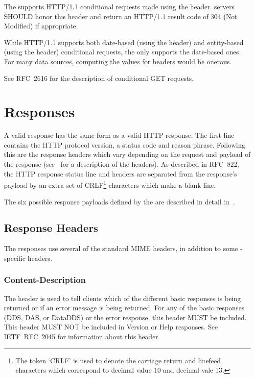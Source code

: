 \documentclass[justify]{nasa-ese}
\begin{document}
The \DAP supports HTTP/1.1 conditional requests made using the
 header. \DAP servers SHOULD honor this header
and return an HTTP/1.1 result code of 304 (Not Modified) if
appropriate. 

While HTTP/1.1 supports both date-based (using the 
header) and entity-based (using the  header) conditional
requests, the \DAP only supports the date-based ones. For many data
sources, computing the values for  headers would be onerous.

See RFC~2616\cite{rfc2616} for the description of
conditional GET requests.

\section{Responses}
\label{sec-responses}

A valid \DAP response has the same form as a valid \ac{HTTP} response. The
first line contains the \ac{HTTP} protocol version, a status code and reason
phrase\cite{rfc2616}. Following this are the response headers which vary
depending on the request and payload of the response
(see~ for a description of the headers). As
described in RFC~822\cite{rfc822}, the \ac{HTTP} response status line and
headers are separated from the response's payload by an extra set of
CRLF\footnote{The token `CRLF' is used to denote the carriage return and
  linefeed characters which correspond to decimal value 10 and decimal vale
  13.} characters which make a blank line.

The six possible response payloads defined by the \DAP are described
in detail in~.

\subsection{Response Headers}
\label{sec-resp-headers}

The \DAP responses use several of the standard MIME headers, in
addition to some \DAP-specific headers.

\subsubsection{Content-Description}
The  header is used to tell clients which of the
different basic responses is being returned or if an error message is being
returned. For any of the basic responses (\ac{DDS}, \ac{DAS}, or
\ac{DataDDS}) or the error response, this header MUST be included. This
header MUST NOT be included in Version or Help responses. See
IETF~RFC~2045\cite{rfc2045} for information about this header.
\end{document}
